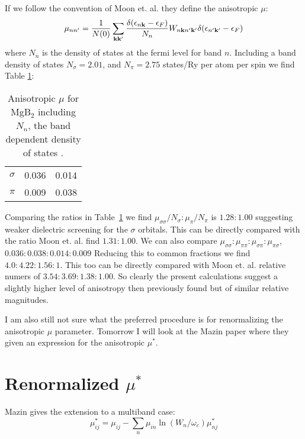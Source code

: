 \documentclass{article}
\def\k{{\bf k}}
\begin{document}
%
If we follow the convention of Moon et. al. they define
the anisotropic $\mu$:
%
\begin{equation}
\mu_{nn'} = \frac{1}{N(0)}\sum_{\k\k'}\frac{\delta(\epsilon_{n\k}-\epsilon_{F})}{N_{n}} W_{n\k n'\k'}
\delta(\epsilon_{n'\k'}-\epsilon_{F})
\end{equation}
%
where $N_{n}$ is the density of states at the fermi level for band $n$.
Including a band density of states $N_{\sigma} = 2.01$, and $N_{\pi}=2.75$ 
states/Ry per atom per spin we find Table \ref{tab:bdos}:
%
\begin{table}
\begin{center}
\begin{tabular}{l c c}
$\sigma$  & 0.036  & 0.014 \\
$\pi$     & 0.009  & 0.038 \\
\end{tabular}
\caption{Anisotropic $\mu$ for MgB$_2$ including $N_{n}$, the band dependent density of states
. \label{tab:bdos}}
\end{center}
\end{table}
%

Comparing the ratios in Table~\ref{tab:bdos} we find 
$\mu_{\sigma\sigma}/N_{\sigma}:\mu_{\pi}/N_{\pi}$ is $1.28:1.00$ suggesting weaker
dielectric screening for the $\sigma$ orbitals. This can be directly compared
with the ratio Moon et. al. find $1.31:1.00$. We can also compare
$\mu_{\sigma\sigma}:\mu_{\pi\pi}:\mu_{\sigma\pi}:\mu_{\pi\sigma}$,
$0.036:0.038:0.014:0.009$ Reducing this to common fractions
we find $4.0:4.22:1.56:1$. This too can be directly compared with
Moon et. al. relative numers of $3.54:3.69:1.38:1.00$. So clearly the present calculations
suggest a slightly higher level of anisotropy then previously found but 
of similar relative magnitudes.

I am also still not sure what the preferred procedure is for renormalizing
the anisotropic $\mu$ parameter. Tomorrow I will look at the Mazin
paper where they given an expression for the anisotropic $\mu^{*}$.

\section{Renormalized $\mu^{*}$}
Mazin gives the extension to a multiband case:%
%
\begin{equation}
\mu^{*}_{ij} = \mu_{ij} - \sum_{n}\mu_{in} \ln(W_{n}/\omega_{c})\mu^{*}_{nj}
\end{equation}
%
\end{document}
